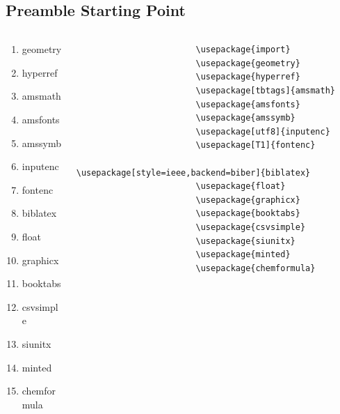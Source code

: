 \documentclass[hidelinks, 12pt]{article}%
\begin{document}
        \subsection{Preamble Starting Point}
            \begin{columns}[onlytextwidth]%
                \begin{column}{0.4\textwidth}%
                    \begin{enumerate}
                        \item geometry
                        \item hyperref
                        \item amsmath
                        \item amsfonts
                        \item amssymb
                        \item inputenc
                        \item fontenc
                        \item biblatex
                        \item float
                        \item graphicx
                        \item booktabs
                        \item csvsimple
                        \item siunitx
                        \item minted
                        \item chemformula
                    \end{enumerate}
                \end{column}
                \begin{column}{0.6\textwidth}%
                    \begin{verbatim}
                        \usepackage{import}
                        \usepackage{geometry}
                        \usepackage{hyperref}
                        \usepackage[tbtags]{amsmath}
                        \usepackage{amsfonts}
                        \usepackage{amssymb}
                        \usepackage[utf8]{inputenc}
                        \usepackage[T1]{fontenc}
                        \usepackage[style=ieee,backend=biber]{biblatex}
                        \usepackage{float}
                        \usepackage{graphicx}
                        \usepackage{booktabs}
                        \usepackage{csvsimple}
                        \usepackage{siunitx}
                        \usepackage{minted}
                        \usepackage{chemformula}
                    \end{verbatim}
                \end{column}
            \end{columns}
\end{document}
